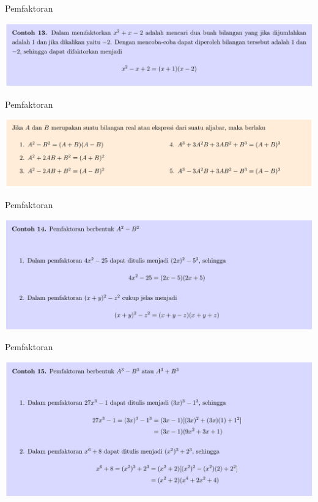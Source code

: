\documentclass[pdflatex,compress,mathserif]{beamer}
\begin{document}
\begin{frame}{Pemfaktoran}
	\begin{center}
		\includegraphics[width=\linewidth]{img/img28}
	\end{center}
\end{frame}

\begin{frame}{Pemfaktoran}
	\begin{center}
		\includegraphics[width=\linewidth]{img/img29}
	\end{center}
\end{frame}

\begin{frame}{Pemfaktoran}
	\begin{center}
		\includegraphics[width=\linewidth]{img/img30}
	\end{center}
\end{frame}

\begin{frame}{Pemfaktoran}
	\begin{center}
		\includegraphics[width=\linewidth]{img/img31}
	\end{center}
\end{frame}
\end{document}
